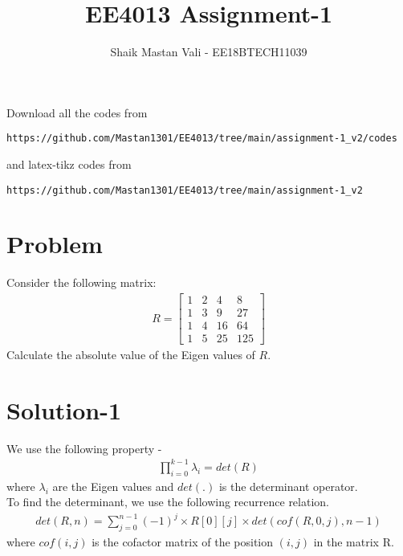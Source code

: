 \documentclass[journal,12pt,twocolumn]{IEEEtran}
\begin{document}
     \def\rightbox#1{\makebox[0in][r]{#1}}
     \def\centbox#1{\makebox[0in]{#1}}
     \def\topbox#1{\raisebox{-\baselineskip}[0in][0in]{#1}}
     \def\midbox#1{\raisebox{-0.5\baselineskip}[0in][0in]{#1}}
\vspace{3cm}
\title{EE4013 Assignment-1}
\author{Shaik Mastan Vali - EE18BTECH11039}
\maketitle
\newpage
\bigskip
\renewcommand{\thefigure}{\theenumi}
\renewcommand{\thetable}{\theenumi}
Download all the codes from 
\begin{lstlisting}
https://github.com/Mastan1301/EE4013/tree/main/assignment-1_v2/codes
\end{lstlisting}
%
and latex-tikz codes from 
%
\begin{lstlisting}
https://github.com/Mastan1301/EE4013/tree/main/assignment-1_v2
\end{lstlisting}

\section{Problem}
Consider the following matrix:
\begin{align*}
    R = \begin{bmatrix}
        1 & 2 & 4 & 8 \\
        1 & 3 & 9 & 27 \\
        1 & 4 & 16 & 64 \\
        1 & 5 & 25 & 125
    \end{bmatrix}
\end{align*}
Calculate the absolute value of the Eigen values of $R$.

\section{\textbf{Solution-1}}
We use the following property -
\begin{align*}
    \prod_{i = 0}^{k - 1} \lambda_{i} = det(R)
\end{align*}
where $\lambda_{i}$ are the Eigen values and $det(.)$ is the determinant operator. \\
To find the determinant, we use the following recurrence relation.
\begin{align*}
    det(R, n) = \sum_{j = 0}^{n - 1} (-1) ^ {j} \times R[0][j] \times det(cof(R, 0, j), n - 1)
\end{align*}
where $cof(i, j)$ is the cofactor matrix of the position $(i, j)$ in the matrix R. \\ \\
\end{document}
